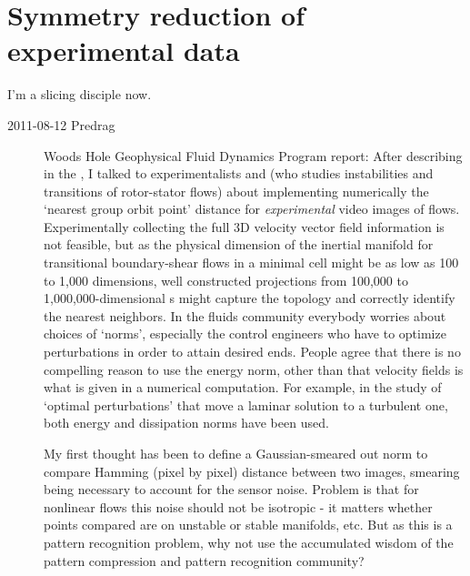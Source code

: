 
\chapter{Symmetry reduction of experimental data}
\label{c-exp}

\begin{bartlett}{
I'm a slicing disciple now.
}
\end{bartlett}



\begin{description}

\item[2011-08-12 Predrag] Woods Hole Geophysical Fluid Dynamics Program
report: After describing in
the \mslices, I talked to experimentalists
and
(who studies instabilities and transitions of rotor-stator flows) about
implementing numerically the `nearest group orbit point' distance for
\emph{experimental} video images of flows. Experimentally collecting the
full 3D velocity vector field information is not feasible, but as the
physical dimension of the inertial manifold for transitional
boundary-shear flows in a minimal cell might be as low as 100 to 1,000
dimensions, well constructed projections from 100,000 to
1,000,000-dimensional \statesp s might capture the topology and correctly
identify the nearest neighbors. In the fluids community everybody worries
about choices of `norms', especially the control engineers who have to
optimize perturbations in order to attain desired ends. People agree that
there is no compelling reason to use the energy norm, other than that
velocity fields is what is given in a numerical computation. For example,
in the study of `optimal perturbations' that move a laminar solution to a
turbulent one, both energy and dissipation
norms have been used.

My first thought has been to define a Gaussian-smeared out norm to
compare Hamming (pixel by pixel) distance between two images, smearing
being necessary to account for the sensor noise. Problem is that for
nonlinear flows this noise should not be isotropic
- it matters whether points compared are on unstable or stable manifolds,
etc. But as this is a pattern recognition problem, why not use the
accumulated wisdom of the pattern compression and pattern recognition
community?

\end{description}

